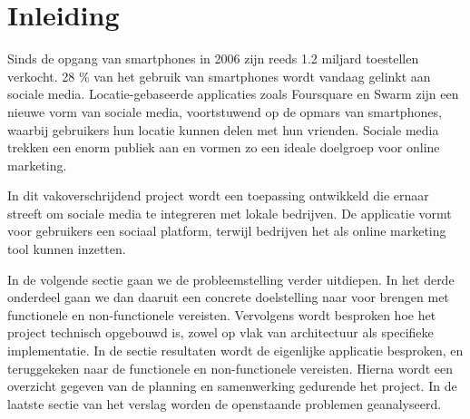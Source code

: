 \chapter{Inleiding}

Sinds de opgang van smartphones in 2006 zijn reeds 1.2 miljard toestellen verkocht\cite{smartphone_sales}. 28 \% van het gebruik van smartphones wordt vandaag gelinkt aan sociale media. Locatie-gebaseerde applicaties zoals Foursquare\cite{foursquare} en Swarm\cite{swarm} zijn een nieuwe vorm van sociale media, voortstuwend op de opmars van smartphones, waarbij gebruikers hun locatie kunnen delen met hun vrienden.
Sociale media trekken een enorm publiek aan en vormen zo een ideale doelgroep voor online marketing. 

In dit vakoverschrijdend project wordt een toepassing ontwikkeld die ernaar streeft om sociale media te integreren met lokale bedrijven.
De applicatie vormt voor gebruikers een sociaal platform, terwijl bedrijven het als online marketing tool kunnen inzetten.

In de volgende sectie gaan we de probleemstelling verder uitdiepen. In het derde onderdeel  gaan we dan daaruit een concrete doelstelling naar voor brengen met functionele en non-functionele vereisten. Vervolgens wordt besproken hoe het project technisch opgebouwd is, zowel op vlak van architectuur als specifieke implementatie. In de sectie resultaten wordt de eigenlijke applicatie besproken, en teruggekeken naar de functionele en non-functionele vereisten. Hierna wordt een overzicht gegeven van de planning en samenwerking gedurende het project. In de laatste sectie van het verslag worden de openstaande problemen geanalyseerd.